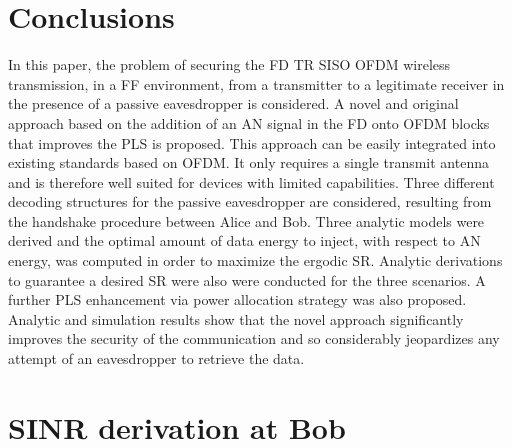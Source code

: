 \documentclass[journal,comsoc]{IEEEtran}
\let\MYoriglatexcaption\caption
\renewcommand{\caption}[2][\relax]{\MYoriglatexcaption[#2]{#2}}
\begin{document}
\section{Conclusions}\label{sec:conclusions}
In this paper, the problem of securing the FD TR SISO OFDM wireless transmission, in a FF environment, from a transmitter to a legitimate receiver in the presence of a passive eavesdropper is considered. A novel and original approach based on the addition of an AN signal in the FD onto OFDM blocks that improves the PLS is proposed. This approach can be easily integrated into existing standards based on OFDM. It only requires a single transmit antenna and is therefore well suited for devices with limited capabilities. Three different decoding structures for the passive eavesdropper are considered, resulting from the handshake procedure between Alice and Bob. Three analytic models were derived and the optimal amount of data energy to inject, with respect to AN energy, was computed in order to maximize the ergodic SR. Analytic derivations to guarantee a desired SR were also were conducted for the three scenarios. A further PLS enhancement via power allocation strategy was also proposed. Analytic and simulation results show that the novel approach significantly improves the security of the communication and so considerably jeopardizes any attempt of an eavesdropper to retrieve the data.














\appendices
\section{SINR derivation at Bob}\label{sec:sinr-derivation-app}
\end{document}

